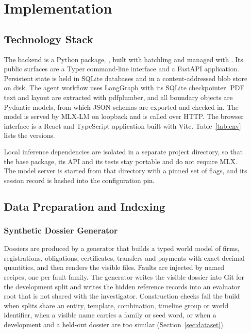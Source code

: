 \chapter{Implementation}
\label{ch:impl}

\section{Technology Stack}
The backend is a Python package, , built with hatchling and managed with . Its
public surfaces are a Typer command-line interface and a FastAPI application. Persistent state is held in
SQLite databases and in a content-addressed blob store on disk. The agent workflow uses LangGraph
\cite{langgraph} with its SQLite checkpointer. PDF text and layout are extracted with pdfplumber, and all
boundary objects are Pydantic models, from which JSON schemas are exported and checked in. The model is
served by MLX-LM \cite{mlxlm} on loopback and is called over HTTP. The browser interface is a React and
TypeScript application built with Vite. Table~\ref{tab:env} lists the versions.

Local inference dependencies are isolated in a separate project directory, so that the base package, its
API and its tests stay portable and do not require MLX. The model server is started from that directory with
a pinned set of flags, and its session record is hashed into the configuration pin.

\section{Data Preparation and Indexing}
\label{sec:dataprep}
\subsection{Synthetic Dossier Generator}
Dossiers are produced by a generator that builds a typed world model of firms, registrations, obligations,
certificates, transfers and payments with exact decimal quantities, and then renders the visible files.
Faults are injected by named recipes, one per fault family. The generator writes the visible dossier into
Git for the development split and writes the hidden reference records into an evaluator root that is not
shared with the investigator. Construction checks fail the build when splits share an entity, template,
combination, timeline group or world identifier, when a visible name carries a family or seed word, or when a
development and a held-out dossier are too similar (Section~\ref{sec:dataset}).

